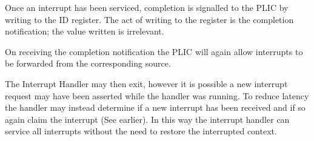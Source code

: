 Once an interrupt has been serviced, completion is signalled to the PLIC by writing to the ID register.
The act of writing to the register is the completion notification; the value written is irrelevant.

On receiving the completion notification the PLIC will again allow interrupts to be forwarded from the corresponding source.

The Interrupt Handler may then exit, however it is possible a new
interrupt request may have been asserted while the handler was running.
To reduce latency the handler may instead determine if a new interrupt
has been received and if so again claim the interrupt (See earlier). In this
way the interrupt handler can service all interrupts without the need to
restore the interrupted context.
